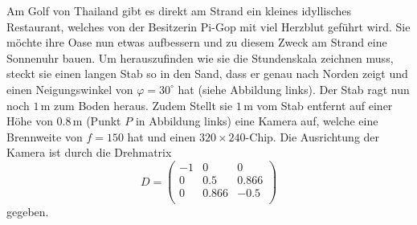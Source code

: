 Am Golf von Thailand gibt es direkt am Strand ein kleines idyllisches 
Restaurant, welches von der Besitzerin Pi-Gop mit viel Herzblut geführt wird. 
Sie möchte ihre Oase nun etwas aufbessern und zu diesem Zweck am Strand eine
Sonnenuhr bauen. Um herauszufinden wie sie die Stundenskala zeichnen muss,
steckt sie einen langen Stab so in den Sand, dass er genau nach Norden zeigt 
und einen Neigungswinkel von $\varphi = 30^\circ$ hat (siehe Abbildung links).
Der Stab ragt nun noch $1\,$m zum Boden heraus. Zudem Stellt sie $1\,$m vom Stab 
entfernt auf einer Höhe von $0.8\,$m (Punkt $P$ in Abbildung links) eine Kamera auf,
welche eine Brennweite von $f=150$ hat und einen $320\times240$-Chip. Die Ausrichtung 
der Kamera ist durch die Drehmatrix
\[
D
=
\begin{pmatrix}
-1     &    0  &       0\\
0 &   0.5  &  0.866\\
0 &   0.866 &  -0.5\\
\end{pmatrix}
\]
gegeben.
